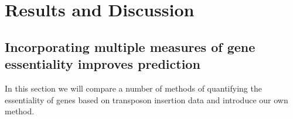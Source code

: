 \documentclass[12pt,letterpaper]{article}
\begin{document}



\section{Results and Discussion}
\subsection{Incorporating multiple measures of gene essentiality improves prediction}
In this section we will compare a number of methods of quantifying the essentiality of genes based on transposon insertion data and introduce our own method.
\end{document}
